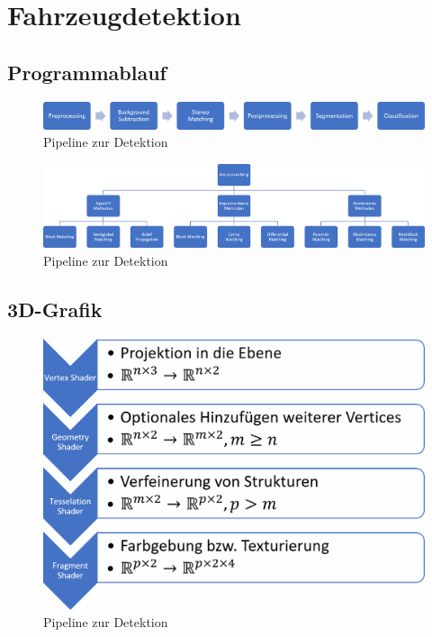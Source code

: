 \chapter{Fahrzeugdetektion}



\section{Programmablauf}

\begin{figure}
 \centering
 \includegraphics[width=1.1\textwidth]{media/pipeline.png}
 \caption{Pipeline zur Detektion}
 \label{fig:detection_programpipeline}
\end{figure}

\begin{figure}
 \centering
 \includegraphics[width=1.1\textwidth]{media/detection/stereomatcher.png}
 \caption{Pipeline zur Detektion}
 \label{fig:detection_stereomatcher}
\end{figure}

\section{3D-Grafik}
\begin{figure}
 \centering
 \includegraphics[width=1.1\textwidth]{media/detection/graphics_pipeline.png}
 \caption{Pipeline zur Detektion}
 \label{fig:detection_graphicspipeline}
\end{figure}


